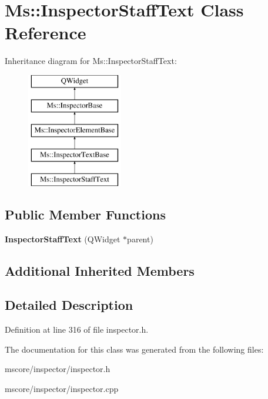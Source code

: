 \hypertarget{class_ms_1_1_inspector_staff_text}{}\section{Ms\+:\+:Inspector\+Staff\+Text Class Reference}
\label{class_ms_1_1_inspector_staff_text}
Inheritance diagram for Ms\+:\+:Inspector\+Staff\+Text\+:\begin{figure}[H]
\begin{center}
\leavevmode
\includegraphics[height=5.000000cm]{class_ms_1_1_inspector_staff_text}
\end{center}
\end{figure}
\subsection*{Public Member Functions}
\begin{DoxyCompactItemize}
\item 
\mbox{\label{class_ms_1_1_inspector_staff_text_a9d5f5d31f3594689db778f5d837e8cfe}} 
{\bfseries Inspector\+Staff\+Text} (Q\+Widget $\ast$parent)
\end{DoxyCompactItemize}
\subsection*{Additional Inherited Members}


\subsection{Detailed Description}


Definition at line 316 of file inspector.\+h.



The documentation for this class was generated from the following files\+:\begin{DoxyCompactItemize}
\item 
mscore/inspector/inspector.\+h\item 
mscore/inspector/inspector.\+cpp\end{DoxyCompactItemize}
